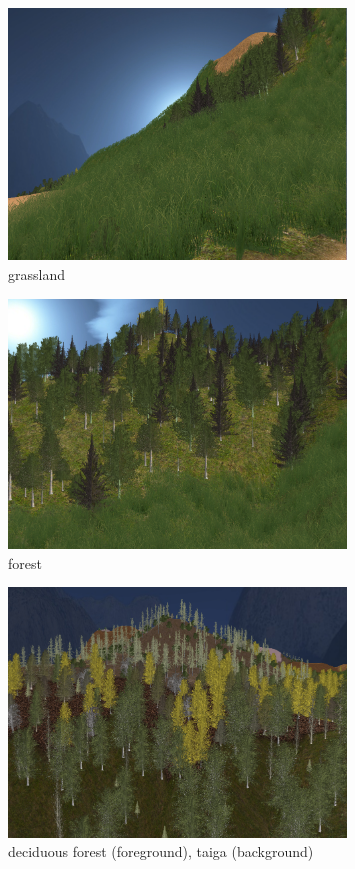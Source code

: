 \documentclass[journal, letterpaper]{IEEEtran}
\begin{document}
\begin{figure}
	\centering
	\includegraphics[width=0.8\textwidth]{images/Planted1}
	\caption{grassland}
\end{figure}
\begin{figure}
	\centering
	\includegraphics[width=0.8\textwidth]{images/Planted2}
	\caption{forest}
\end{figure}
\begin{figure}
	\centering
	\includegraphics[width=0.8\textwidth]{images/Planted3}
	\caption{deciduous forest (foreground), taiga (background)}
\end{figure}
\end{document}
